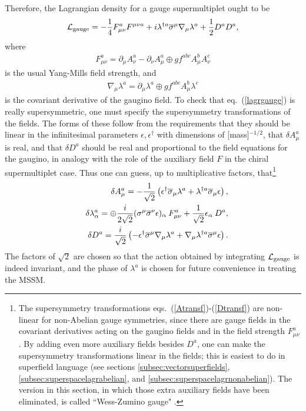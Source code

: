 \documentclass[12pt]{article}
\def\BDneg{-}
\def\BDminus{-}
\def\BDneg{}
\def\BDminus{+}
\def\BDneg{\ominus}
\def\BDminus{\ominus}
\def\BDneg{\oplus}
\def\BDminus{\oplus}
\def\beq{\begin{eqnarray}}
\def\eeq{\end{eqnarray}}
\def\lagr{{\cal L}}
\def\sigmabar{\overline\sigma}
\begin{document}
Therefore, the Lagrangian density for a gauge supermultiplet ought to be
\beq
\lagr_{\rm gauge} = -{1\over 4} F_{\mu\nu}^a F^{\mu\nu a}
+ i \lambda^{\dagger a} \sigmabar^\mu \nabla_\mu \lambda^a
+ {1\over 2} D^a D^a ,
\label{lagrgauge}
\eeq
where
\beq
F^a_{\mu\nu} = \partial_\mu A^a_\nu - \partial_\nu A^a_\mu 
               \BDminus g f^{abc} A^b_\mu A^c_\nu
\label{eq:YMfs}
\eeq
is the usual Yang-Mills field strength, and
\beq
\nabla_\mu \lambda^a = \partial_\mu \lambda^a 
                  \BDminus g f^{abc} A^b_\mu \lambda^c
\label{ordtocovlambda}
\eeq
is the covariant derivative of the gaugino field. To check that
eq.~(\ref{lagrgauge}) is really supersymmetric, one must specify the
supersymmetry transformations of the fields. 
The forms of these follow from the requirements that they should be linear
in the infinitesimal parameters $\epsilon,\epsilon^\dagger$ with
dimensions of [mass]$^{-1/2}$, that $\delta A^a_\mu$ is real, and that
$\delta D^a$ should be real and proportional to the field equations for
the gaugino, in analogy with the role of the auxiliary field $F$ in the
chiral supermultiplet case. Thus one can guess, up to multiplicative
factors, that\footnote{The supersymmetry transformations
eqs.~(\ref{Atransf})-(\ref{Dtransf}) are non-linear for non-Abelian gauge
symmetries, since there are gauge fields in the covariant
derivatives acting on the gaugino fields and in the field strength $F_{\mu
\nu}^a$. By adding even more auxiliary fields besides $D^a$, one can make
the supersymmetry transformations linear in the fields; this is easiest to
do in superfield language (see sections \ref{subsec:vectorsuperfields}, 
\ref{subsec:superspacelagrabelian}, and \ref{subsec:superspacelagrnonabelian}). 
The version in this section, in which those extra auxiliary fields 
have been eliminated, is called ``Wess-Zumino gauge" \cite{WZgauge}.}
\beq
&& \delta A_\mu^a = 
- {1\over \sqrt{2}} \left (\epsilon^\dagger \sigmabar_\mu
\lambda^a + \lambda^{\dagger a} \sigmabar_\mu \epsilon \right )
,
\label{Atransf}
\\
&& \delta \lambda^a_\alpha =
\BDneg {i\over 2\sqrt{2}} (\sigma^\mu \sigmabar^\nu \epsilon)_\alpha
\> F^a_{\mu\nu} + {1\over \sqrt{2}} \epsilon_\alpha\> D^a 
,
\\
&& \delta D^a =  {i\over \sqrt{2}} \left (
-\epsilon^\dagger \sigmabar^\mu \nabla_\mu \lambda^a 
+\nabla_\mu \lambda^{\dagger a} \sigmabar^\mu \epsilon \right ) .
\label{Dtransf}
\eeq
The factors of $\sqrt{2}$ are chosen so that the action obtained by
integrating $\lagr_{\rm gauge}$ is indeed invariant, and the phase of
$\lambda^a$ is chosen for future convenience in treating the MSSM.
\end{document}
